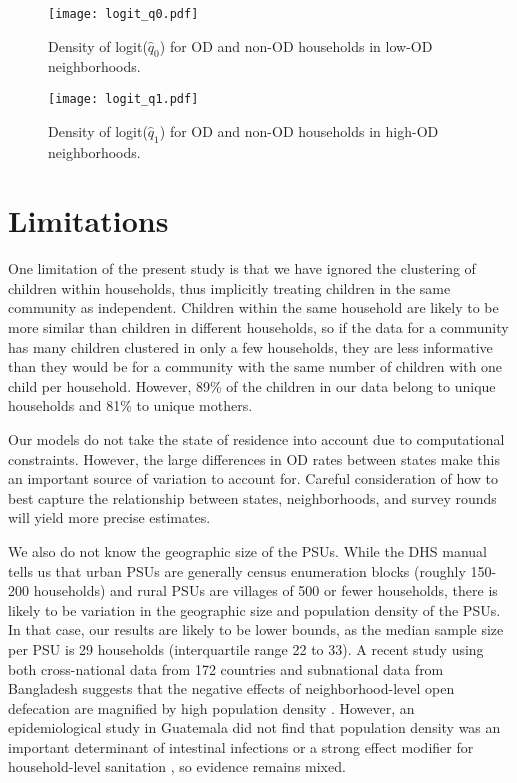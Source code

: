 \documentclass[12pt,a4paper,titlepage]{article}
\begin{document}
\begin{appendices}
\begin{figure}[h!]
	\centering
	\texttt{[image: logit\_q0.pdf]}
	\caption{Density of logit($\widehat{q}_0$) for OD and non-OD households in low-OD neighborhoods.}
	\label{fig:logit_q0}
\end{figure}

\begin{figure}[h!]
	\centering
	\texttt{[image: logit\_q1.pdf]}
	\caption{Density of logit($\widehat{q}_1$) for OD and non-OD households in high-OD neighborhoods.}
	\label{fig:logit_q1}
\end{figure}


\section{Limitations}\label{sec:lims}
One limitation of the present study is that we have ignored the clustering of children within households, thus implicitly treating children in the same community as independent. Children within the same household are likely to be more similar than children in different households, so if the data for a community has many children clustered in only a few households, they are less informative than they would be for a community with the same number of children with one child per household. However, 89\% of the children in our data belong to unique households and 81\% to unique mothers.

Our models do not take the state of residence into account due to computational constraints. However, the large differences in OD rates between states make this an important source of variation to account for. Careful consideration of how to best capture the relationship between states, neighborhoods, and survey rounds will yield more precise estimates.

We also do not know the geographic size of the PSUs. While the DHS manual tells us that urban PSUs are generally census enumeration blocks (roughly 150-200 households) and rural PSUs are villages of 500 or fewer households, there is likely to be variation in the geographic size and population density of the PSUs. In that case, our results are likely to be lower bounds, as the median sample size per PSU is 29 households (interquartile range 22 to 33). A recent study using both cross-national data from 172 countries and subnational data from Bangladesh suggests that the negative effects of neighborhood-level open defecation are magnified by high population density \citep{hathi2017}. However, an epidemiological study in Guatemala did not find that population density was an important determinant of intestinal infections or a strong effect modifier for household-level sanitation \citep{guatemala}, so evidence remains mixed.

\end{appendices}
\end{document}
